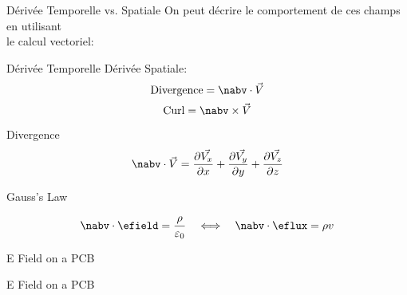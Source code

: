 \begin{frame}{Dérivée Temporelle vs. Spatiale}
    \centering
    On peut décrire le comportement de ces champs en utilisant\\
    le calcul vectoriel:
    \vspace{15pt}
    \begin{twocolumns}[0.5]
        \leftcol
            Dérivée Temporelle
        \rightcol
           Dérivée Spatiale:
            \begin{equation}
                \text{Divergence} = \nabv \cdot \vec{V}
            \end{equation}
            \begin{equation}
                \text{Curl} = \nabv \times \vec{V}
            \end{equation}
    \end{twocolumns}
\end{frame}

\begin{frame}{Divergence}
    \begin{equation}
        \nabv \cdot \vec{V} = \frac{\partial \vec{V_x}}{\partial x} + \frac{\partial \vec{V_y}}{\partial y} + \frac{\partial \vec{V_z}}{\partial z}
    \end{equation}
\end{frame}

\begin{frame}{Gauss's Law}
    \begin{twocolumns}[0.5]
    \leftcol
        \vspace{-8pt}
        \begin{equation}
            \nabv \cdot \efield = \frac{\rho}{\varepsilon_0}
            \hspace{1em} \Longleftrightarrow \hspace{1.0em}
            \nabv \cdot \eflux = \rho v
        \end{equation}
    \rightcol
    \end{twocolumns}
\end{frame}
 
\begin{frame}{E Field on a PCB}
    \vspace{-20pt}
\end{frame}

\begin{frame}{E Field on a PCB}
    \vspace{-20pt}
\end{frame}

